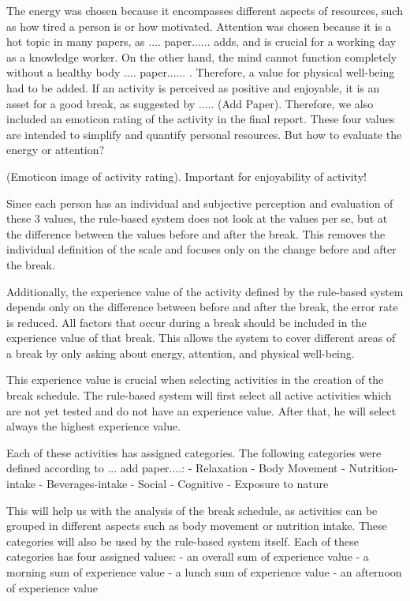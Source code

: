 \documentclass{hasel_thesis}
\begin{document}
The energy was chosen because it encompasses different aspects of resources, such as how tired a person is or how motivated.
Attention was chosen because it is a hot topic in many papers, as .... paper...... adds, and is crucial for a working day as a knowledge worker. 
On the other hand, the mind cannot function completely without a healthy body .... paper...... . Therefore, a value for physical well-being had to be added. If an activity is perceived as positive and enjoyable, it is an asset for a good break, as suggested by ..... (Add Paper). Therefore, we also included an emoticon rating of the activity in the final report. These four values are intended to simplify and quantify personal resources. But how to evaluate the energy or attention?

(Emoticon image of activity rating).
Important for enjoyability of activity!


Since each person has an individual and subjective perception and evaluation of these 3 values, the rule-based system does not look at the values per se, but at the difference between the values before and after the break. This removes the individual definition of the scale and focuses only on the change before and after the break. 

Additionally, the experience value of the activity defined by the rule-based system depends only on the difference between before and after the break, the error rate is reduced. All factors that occur during a break should be included in the experience value of that break. This allows the system to cover different areas of a break by only asking about energy, attention, and physical well-being.

This experience value is crucial when selecting activities in the creation of the break schedule. The rule-based system will first select all active activities which are not yet tested and do not have an experience value. After that, he will select always the highest experience value.

Each of these activities has assigned categories. The following categories were defined according to ... add paper....:
- Relaxation
- Body Movement
- Nutrition-intake
- Beverages-intake
- Social
- Cognitive
- Exposure to nature

This will help us with the analysis of the break schedule, as activities can be grouped in different aspects such as body movement or nutrition intake. These categories will also be used by the rule-based system itself. Each of these categories has four assigned values:
- an overall sum of experience value
- a morning sum of experience value
- a lunch sum of experience value
- an afternoon of experience value
\end{document}
